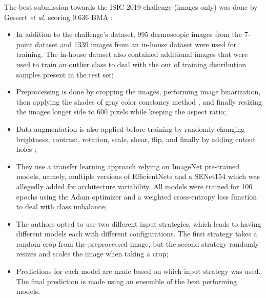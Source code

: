     The best submission towards the \ac{ISIC} 2019 challenge (images only) was done by Gessert \textit{et al.} scoring 0.636 \ac{BMA} \cite{isic2019first}: 
    \begin{itemize}
        \item In addition to the challenge's dataset, 995 dermoscopic images from the 7-point dataset \cite{Kawahara2018-7pt} and 1339 images from an in-house dataset were used for training. The in-house dataset also contained additional images that were used to train an outlier class to deal with the out of training distribution samples present in the test set;
        
        \item Preprocessing is done by cropping the images, performing image binarization, then applying the shades of gray color constancy method \cite{shadesgray}, and finally resizing the images longer side to 600 pixels while keeping the aspect ratio;
        
        \item Data augmentation is also applied before training by randomly changing brightness, contrast, rotation, scale, shear, flip, and finally by adding cutout holes \cite{cutout};
        
        \item They use a transfer learning approach relying on ImageNet pre-trained models, namely, multiple versions of EfficientNets and a SENet154 which was allegedly added for architecture variability. All models were trained for 100 epochs using the Adam optimizer \cite{adam} and a weighted cross-entropy loss function to deal with class unbalance;
        
        \item The authors opted to use two different input strategies, which leads to having different models each with different configurations. The first strategy takes a random crop from the preprocessed image, but the second strategy randomly resizes and scales the image when taking a crop;
        
        \item Predictions for each model are made based on which input strategy was used. The final prediction is made using an ensemble of the best performing models.
    \end{itemize}
    
